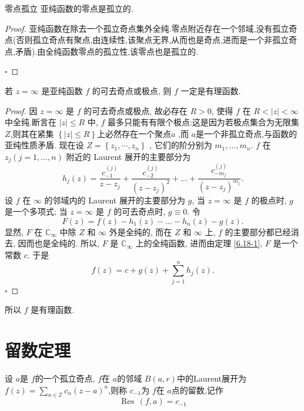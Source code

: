 \documentclass[../../复变函数.tex]{subfiles}
\begin{document}
\begin{proposition}{零点孤立}
    亚纯函数的零点是孤立的.
\end{proposition}
\begin{proof}
    亚纯函数在除去一个孤立奇点集外全纯.零点附近存在一个邻域,没有孤立奇点(否则孤立奇点有聚点,由连续性,该聚点无界,从而也是奇点,进而是一个非孤立奇点,矛盾).由全纯函数零点的孤立性,该零点也是孤立的.

    \hfill $\square$
\end{proof}
\begin{theorem}
    若 $z=\infty$ 是亚纯函数 $f$ 的可去奇点或极点, 则 $f$ 一定是有理函数.
\end{theorem}
\begin{proof}
    因 $z=\infty$ 是 $f$ 的可去奇点或极点, 故必存在 $R>0$, 使得 $f$ 在 $R<|z|<\infty$ 中全纯.断言在 $|z|\le R$ 中, $f$ 最多只能有有限个极点:这是因为若极点集合为无限集 \(  Z  \),则其在紧集 \(  \left\{ \left| z \right|\le R  \right\}  \)上必然存在一个聚点\(  a  \) ,而 \(  a  \)是一个非孤立奇点,与函数的亚纯性质矛盾.  现在设 \(  Z= \left\{ z_1,\cdots ,z_{n} \right\}  \) , 它们的阶分别为 $m_1,\dots,m_n$. $f$ 在 $z_j (j=1,\dots,n)$ 附近的 Laurent 展开的主要部分为
\begin{equation*}
h_j(z) = \frac{c_{-1}^{(j)}}{z-z_j} + \frac{c_{-2}^{(j)}}{(z-z_j)^2} + \dots + \frac{c_{-m_j}^{(j)}}{(z-z_j)^{m_j}}.
\end{equation*}
设 $f$ 在 $\infty$ 的邻域内的 Laurent 展开的主要部分为 $g$, 当 $z=\infty$ 是 $f$ 的极点时, $g$ 是一个多项式; 当 $z=\infty$ 是 $f$ 的可去奇点时, $g \equiv 0$. 令
\begin{equation*}
F(z) = f(z) - h_1(z) - \dots - h_n(z) - g(z).
\end{equation*}
显然, $F$ 在 $\mathbb{C}_\infty$ 中除 $Z$ 和 $\infty$ 外是全纯的, 而在 $Z$ 和 $\infty$ 上, $f$ 的主要部分都已经消去, 因而也是全纯的. 所以, $F$ 是 $\mathbb{C}_\infty$ 上的全纯函数, 进而由定理 \ref{6.18-1}, $F$ 是一个常数 $c$. 于是
\begin{equation*}
f(z) = c + g(z) + \sum_{j=1}^n h_j(z).
\end{equation*}
    \hfill $\square$
\end{proof}所以 $f$ 是有理函数.

\section{留数定理}


\begin{definition}
    设 \(  a  \)是 \(  f  \)的一个孤立奇点, \(  f  \)在 \(  a  \)的邻域 \(  B\left( a,r \right)   \)中的Laurent展开为 \(  f\left( z \right)= \sum _{n\in \mathbb{Z} }c_{n}\left( z-a \right)^{n}    \),则称 \(  c_{-1}  \)为 \(  f  \)在 \(  a  \)点的留数,记作 \[
    \operatorname{Res}\,\left( f,a \right)= c_{-1} 
    \]         
\end{definition}
\end{document}
